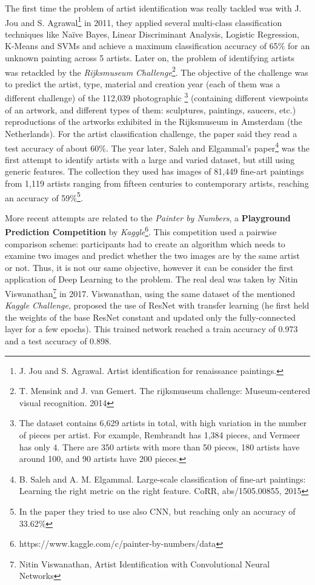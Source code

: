 The first time the problem of artist identification was really tackled was with J. Jou and S. Agrawal\footnote{J. Jou and S. Agrawal. Artist identification for renaissance paintings.} in 2011, they applied several multi-class classification techniques like Naïve Bayes, Linear Discriminant Analysis, Logistic Regression, K-Means and SVMs and achieve a maximum classification accuracy of 65\% for an unknown painting across 5 artists. 
Later on, the problem of identifying artists was retackled by the \textit{Rijksmuseum Challenge}\footnote{T. Mensink and J. van Gemert. The rijksmuseum challenge: Museum-centered visual recognition. 2014}. The objective of the challenge was to predict the artist, type, material and creation year (each of them was a different challenge) of the 112,039 photographic \footnote{The dataset contains 6,629 artists in total, with high variation in the number of pieces per artist. For example, Rembrandt has 1,384 pieces, and Vermeer has only 4. There are 350 artists with more than 50 pieces, 180 artists have around 100, and 90 artists have 200 pieces.} (containing different viewpoints of an artwork, and different types of them: sculptures, paintings, saucers, etc.) reproductions of the artworks exhibited in the Rijksmuseum in Amsterdam (the Netherlands). For the artist classification challenge, the paper said they read a test accuracy of about 60\%. The year later, Saleh and Elgammal's paper\footnote{B. Saleh and A. M. Elgammal. Large-scale classification of fine-art paintings: Learning the right metric on the right
feature. CoRR, abs/1505.00855, 2015} was the first attempt to identify artists with a large and varied dataset, but still using generic features. The collection they used has images of 81,449 fine-art paintings from 1,119 artists ranging from fifteen centuries to contemporary artists, reaching an accuracy of 59\%\footnote{In the paper they tried to use also CNN, but reaching only an accuracy of 33.62\%}.


More recent attempts are related to the \textit{Painter by Numbers}, a \textbf{Playground Prediction Competition} by \textit{Kaggle}\footnote{https://www.kaggle.com/c/painter-by-numbers/data}. This competition used a pairwise comparison scheme: participants had to create an algorithm which needs to examine two images and predict whether the two images are by the same artist or not. Thus, it is not our same objective, however it can be consider the first application of Deep Learning to the problem. The real deal was taken by Nitin Viswanathan\footnote{Nitin Viswanathan, Artist Identification with Convolutional Neural Networks} in 2017.
Viswanathan, using the same dataset of the mentioned \textit{Kaggle Challenge}, proposed the use of ResNet with transfer learning (he first held the weights of the base ResNet constant and updated only the fully-connected layer for a few epochs). This trained network reached a train accuracy of 0.973 and a test accuracy of 0.898.



